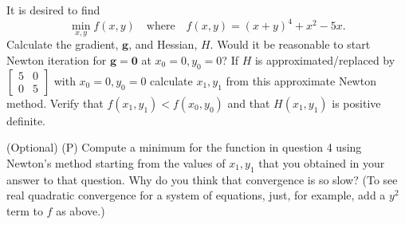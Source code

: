 \documentclass[answers]{exam}
\begin{document}
\begin{questions}
\question%
It is desired to find \[
	\min _{x, y} f(x, y)\quad\text{where}\quad f(x, y)=(x+y)^{4}+x^{2}-5 x.
\] Calculate the gradient, $\mathbf{g}$, and Hessian, $H$. Would it be reasonable to start Newton iteration for $\mathbf{g}=\mathbf{0}$ at $x_{0}=0, y_{0}=0$? If $H$ is approximated/replaced by $\begin{bmatrix}5 & 0 \\ 0 & 5\end{bmatrix}$ with $x_{0}=0, y_{0}=0$ calculate $x_{1}, y_{1}$ from this approximate Newton method. Verify that $f\left(x_{1}, y_{1}\right)<f\left(x_{0}, y_{0}\right)$ and that $H\left(x_{1}, y_{1}\right)$ is positive definite.



\question%
(Optional) (P) Compute a minimum for the function in question 4 using Newton's method starting from the values of $x_{1}, y_{1}$ that you obtained in your answer to that question. Why do you think that convergence is so slow? (To see real quadratic convergence for a system of equations, just, for example, add a $y^{2}$ term to $f$ as above.)

\end{questions}
\end{document}
